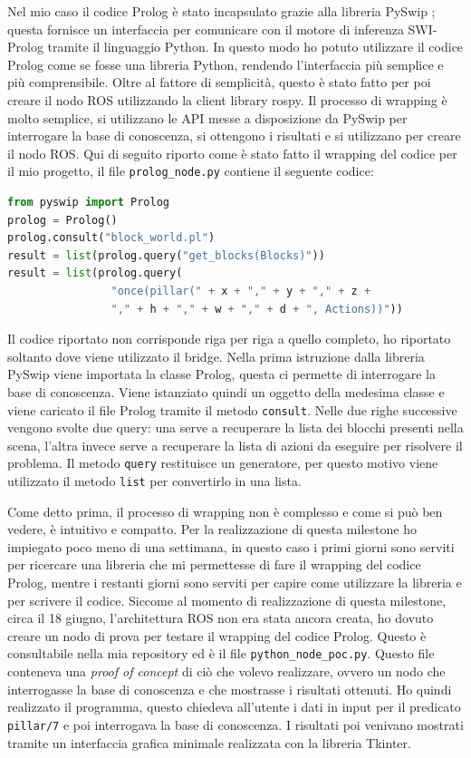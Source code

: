 Nel mio caso il codice Prolog è stato incapsulato grazie alla libreria PySwip \cite{pyswip}; questa fornisce un interfaccia per comunicare con il motore di inferenza SWI-Prolog tramite il linguaggio Python.
In questo modo ho potuto utilizzare il codice Prolog come se fosse una libreria Python, rendendo l'interfaccia più semplice e più comprensibile. 
Oltre al fattore di semplicità, questo è stato fatto per poi creare il nodo ROS utilizzando la client library rospy.
Il processo di wrapping è molto semplice, si utilizzano le API messe a disposizione da PySwip per interrogare la base di conoscenza, si ottengono i risultati e si utilizzano per creare il nodo ROS.
Qui di seguito riporto come è stato fatto il wrapping del codice per il mio progetto, il file \verb+prolog_node.py+ contiene il seguente codice:
\begin{lstlisting}[language=Python]
from pyswip import Prolog
prolog = Prolog()
prolog.consult("block_world.pl")
result = list(prolog.query("get_blocks(Blocks)"))
result = list(prolog.query(
                "once(pillar(" + x + "," + y + "," + z + 
                "," + h + "," + w + "," + d + ", Actions))"))
\end{lstlisting}
Il codice riportato non corrisponde riga per riga a quello completo, ho riportato soltanto dove viene utilizzato il bridge. Nella prima istruzione dalla libreria PySwip viene importata la classe Prolog, questa ci permette di interrogare la base di conoscenza. Viene istanziato quindi un oggetto della medesima classe e viene caricato il file Prolog tramite il metodo \verb+consult+.
Nelle due righe successive vengono svolte due query: una serve a recuperare la lista dei blocchi presenti nella scena, l'altra invece serve a recuperare la lista di azioni da eseguire per risolvere il problema. Il metodo \verb+query+ restituisce un generatore, per questo motivo viene utilizzato il metodo \verb+list+ per convertirlo in una lista. 

Come detto prima, il processo di wrapping non è complesso e come si può ben vedere, è intuitivo e compatto. 
Per la realizzazione di questa milestone ho impiegato poco meno di una settimana, in questo caso i primi giorni sono serviti per ricercare una libreria che mi permettesse di fare il wrapping del codice Prolog, mentre i restanti giorni sono serviti per capire come utilizzare la libreria e per scrivere il codice.
Siccome al momento di realizzazione di questa milestone, circa il 18 giugno, l'architettura ROS non era stata ancora creata, ho dovuto creare un nodo di prova per testare il wrapping del codice Prolog. 
Questo è consultabile nella mia repository ed è il file \verb+python_node_poc.py+. Questo file conteneva una \textit{proof of concept} di ciò che volevo realizzare, ovvero un nodo che interrogasse la base di conoscenza e che mostrasse i risultati ottenuti. 
Ho quindi realizzato il programma, questo chiedeva all'utente i dati in input per il predicato \verb+pillar/7+ e poi interrogava la base di conoscenza. I risultati poi venivano mostrati tramite un interfaccia grafica minimale realizzata con la libreria Tkinter.


